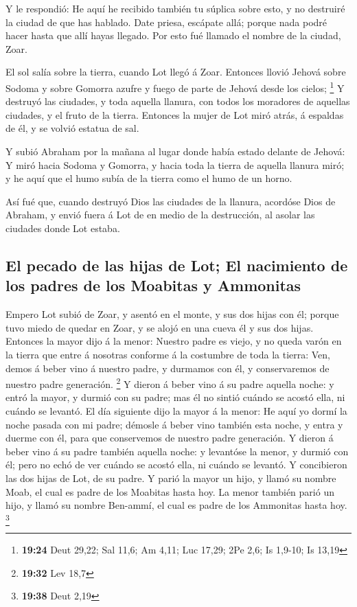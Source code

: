  Y le respondió: He aquí he recibido también tu súplica
sobre esto, y no destruiré la ciudad de que has hablado. 
Date priesa, escápate allá; porque nada podré hacer hasta que allí hayas
llegado. Por esto fué llamado el nombre de la ciudad, Zoar.

 El sol salía sobre la tierra, cuando Lot llegó á Zoar.
 Entonces llovió Jehová sobre Sodoma y sobre Gomorra azufre
y fuego de parte de Jehová desde los cielos; \footnote{\textbf{19:24}
  Deut 29,22; Sal 11,6; Am 4,11; Luc 17,29; 2Pe 2,6; Is 1,9-10; Is 13,19}
 Y destruyó las ciudades, y toda aquella llanura, con todos
los moradores de aquellas ciudades, y el fruto de la tierra.
 Entonces la mujer de Lot miró atrás, á espaldas de él, y
se volvió estatua de sal.

 Y subió Abraham por la mañana al lugar donde había estado
delante de Jehová:  Y miró hacia Sodoma y Gomorra, y hacia
toda la tierra de aquella llanura miró; y he aquí que el humo subía de
la tierra como el humo de un horno.

 Así fué que, cuando destruyó Dios las ciudades de la
llanura, acordóse Dios de Abraham, y envió fuera á Lot de en medio de la
destrucción, al asolar las ciudades donde Lot estaba.

\hypertarget{el-pecado-de-las-hijas-de-lot-el-nacimiento-de-los-padres-de-los-moabitas-y-ammonitas}{%
\subsection{El pecado de las hijas de Lot; El nacimiento de los padres
de los Moabitas y
Ammonitas}\label{el-pecado-de-las-hijas-de-lot-el-nacimiento-de-los-padres-de-los-moabitas-y-ammonitas}}

 Empero Lot subió de Zoar, y asentó en el monte, y sus dos
hijas con él; porque tuvo miedo de quedar en Zoar, y se alojó en una
cueva él y sus dos hijas.  Entonces la mayor dijo á la
menor: Nuestro padre es viejo, y no queda varón en la tierra que entre á
nosotras conforme á la costumbre de toda la tierra:  Ven,
demos á beber vino á nuestro padre, y durmamos con él, y conservaremos
de nuestro padre generación. \footnote{\textbf{19:32} Lev 18,7}
 Y dieron á beber vino á su padre aquella noche: y entró la
mayor, y durmió con su padre; mas él no sintió cuándo se acostó ella, ni
cuándo se levantó.  El día siguiente dijo la mayor á la
menor: He aquí yo dormí la noche pasada con mi padre; démosle á beber
vino también esta noche, y entra y duerme con él, para que conservemos
de nuestro padre generación.  Y dieron á beber vino á su
padre también aquella noche: y levantóse la menor, y durmió con él; pero
no echó de ver cuándo se acostó ella, ni cuándo se levantó.
 Y concibieron las dos hijas de Lot, de su padre.
 Y parió la mayor un hijo, y llamó su nombre Moab, el cual
es padre de los Moabitas hasta hoy.  La menor también parió
un hijo, y llamó su nombre Ben-ammí, el cual es padre de los Ammonitas
hasta hoy. \footnote{\textbf{19:38} Deut 2,19}

